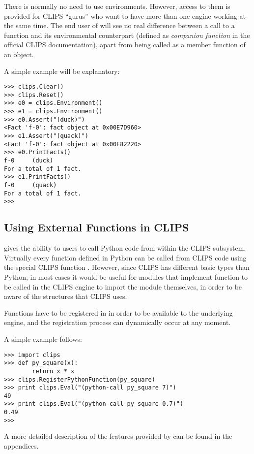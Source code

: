 There is normally no need to use environments. However, access to them
is provided for CLIPS ``gurus'' who want to have more than one engine
working at the same time. The end user of \pyclips{} will see no real
difference between a call to a function and its environmental counterpart
(defined as \emph{companion function} in the official CLIPS documentation),
apart from being called as a member function of an 
object.

A simple example will be explanatory:

\begin{verbatim}
>>> clips.Clear()
>>> clips.Reset()
>>> e0 = clips.Environment()
>>> e1 = clips.Environment()
>>> e0.Assert("(duck)")
<Fact 'f-0': fact object at 0x00E7D960>
>>> e1.Assert("(quack)")
<Fact 'f-0': fact object at 0x00E82220>
>>> e0.PrintFacts()
f-0     (duck)
For a total of 1 fact.
>>> e1.PrintFacts()
f-0     (quack)
For a total of 1 fact.
>>>
\end{verbatim}


\subsection{Using External Functions in CLIPS\label{pyclips-ov-extfuncs}}

\pyclips{} gives the ability to users to call Python code from within
the CLIPS subsystem. Virtually every function defined in Python can be
called from CLIPS code using the special CLIPS function .
However, since CLIPS has different basic types than Python, in most cases
it would be useful for modules that implement function to be called in
the CLIPS engine to import the \pyclips{} module themselves, in order to
be aware of the structures that CLIPS uses.

Functions have to be registered in \pyclips{} in order to be available
to the underlying engine, and the registration process can dynamically
occur at any moment.

A simple example follows:

\begin{verbatim}
>>> import clips
>>> def py_square(x):
        return x * x
>>> clips.RegisterPythonFunction(py_square)
>>> print clips.Eval("(python-call py_square 7)")
49
>>> print clips.Eval("(python-call py_square 0.7)")
0.49
>>>
\end{verbatim}

A more detailed description of the features provided by 
can be found in the appendices.


